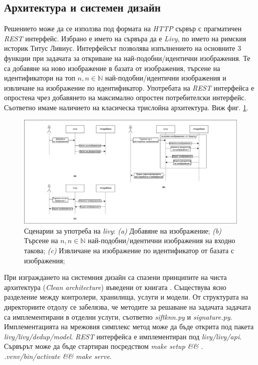 \documentclass[a4paper,12pt]{article}
\begin{document}
\subsection{Архитектура и системен дизайн}

Решението може да се използва под формата на \textit{HTTP} сървър с прагматичен \textit{REST} интерфейс. Избрано е името на сървъра да е \textit{Livy}, по името на римския историк Титус Ливиус. Интерфейсът позволява изпълнението на основните 3 функции при задачата за откриване на най-подобни/идентични изображения. Те са добавяне на ново изображение в базата от изображения, търсене на идентификатори на топ $n, n \in \mathbb{N}$ най-подобни/идентични изображения и извличане на изображение по идентификатор. Употребата на \textit{REST} интерфейса е опростена чрез добавянето на максимално опростен потребителски интерфейс. Съответно имаме наличието на класическа трислойна архитектура. Виж фиг. \ref{fig:sequencediagrams}.

\begin{figure}[ht]
    \centering
    \includegraphics[width=\textwidth]{sequencediagrams.png}
    \caption{Сценарии за употреба на \textit{livy}: \textit{(a)} Добавяне на изображение; \textit{(b)} Търсене на $n, n \in \mathbb{N}$ най-подобни/идентични изображения на входно такова; \textit{(c)} Извличане на изображение по идентификатор от базата с изображения;}
    \label{fig:sequencediagrams}
\end{figure}

\bigbreak

При изграждането на системния дизайн са спазени принципите на чиста архитектура (\textit{Clean architecture}) въведени от книгата \cite{cleanarchitecture}. Съществува ясно разделение между контролери, хранилища, услуги и модели. От структурата на директориите отдолу се забелязва, че методите за решаване на задачата задачата са имплементирани в отделни услуги, съответно \textit{siftknn.py} и \textit{signature.py}. Имплементацията на мрежовия симплекс метод може да бъде открита под пакета \textit{livy/livy/dedup/model}. \textit{REST} интерфейса е имплементиран под \textit{livy/livy/api}. Сървърът може да бъде стартиран посредством \textit{make setup \&\& . .venv/bin/activate \&\& make serve}.
\end{document}
